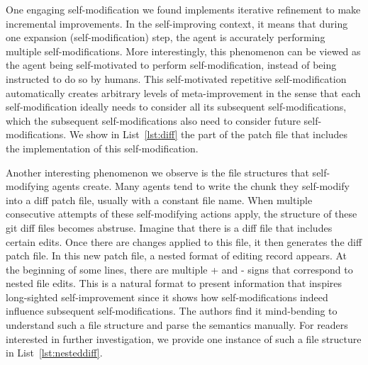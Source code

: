 \documentclass{article}
\begin{document}
One engaging self-modification we found implements iterative refinement to make incremental improvements. In the self-improving context, it means that during one expansion (self-modification) step, the agent is accurately performing multiple self-modifications. More interestingly, this phenomenon can be viewed as the agent being self-motivated to perform self-modification, instead of being instructed to do so by humans. This self-motivated repetitive self-modification automatically creates arbitrary levels of meta-improvement in the sense that each self-modification ideally needs to consider all its subsequent self-modifications, which the subsequent self-modifications also need to consider future self-modifications. We show in List~\ref{lst:diff} the part of the patch file that includes the implementation of this self-modification.

Another interesting phenomenon we observe is the file structures that self-modifying agents create. Many agents tend to write the chunk they self-modify into a diff patch file, usually with a constant file name. When multiple consecutive attempts of these self-modifying actions apply, the structure of these git diff files becomes abstruse. Imagine that there is a diff file that includes certain edits. Once there are changes applied to this file, it then generates the diff patch file. In this new patch file, a nested format of editing record appears. At the beginning of some lines, there are multiple + and - signs that correspond to nested file edits. 
This is a natural format to present information that inspires long-sighted self-improvement since it shows how self-modifications indeed influence subsequent self-modifications.
The authors find it mind‑bending to understand such a file structure and parse the semantics manually. 
For readers interested in further investigation, we provide one instance of such a file structure in List~\ref{lst:nesteddiff}. 







\end{document}
